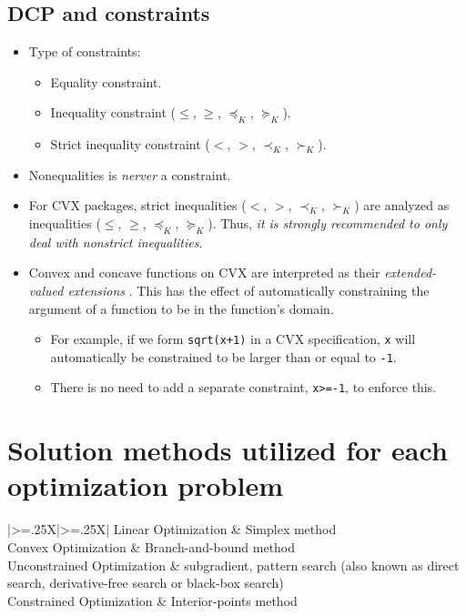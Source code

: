 \documentclass{article}
\begin{document}
\subsection{DCP and constraints}
\begin{itemize}
	\item Type of constraints:
	      \begin{itemize}
		      \item Equality constraint.
		      \item Inequality constraint (\(\leq\), \(\geq\), \(\preceq_K\), \(\succeq_K\)).
		      \item Strict inequality constraint (\(<\), \(>\), \(\prec_K\), \(\succ_K\)).
	      \end{itemize}
	\item Nonequalities is \emph{nerver} a constraint.
	\item For CVX packages, strict inequalities (\(<\), \(>\), \(\prec_K\), \(\succ_K\)) are analyzed as inequalities (\(\leq\), \(\geq\), \(\preceq_K\), \(\succeq_K\)). Thus, \emph{it is strongly recommended to only deal with nonstrict inequalities}.
	\item Convex and concave functions on CVX are interpreted as their \emph{extended-valued extensions} \cite{DCPRulesetCVX}. This has the effect of automatically constraining the argument of a function to be in the function's domain.
	      \begin{itemize}
		      \item For example, if we form \texttt{sqrt(x+1)} in a CVX specification, \texttt{x} will automatically be constrained to be larger than or equal to \texttt{-1}.
		      \item There is no need to add a separate constraint, \texttt{x>=-1}, to enforce this.
	      \end{itemize}
\end{itemize}


\section{Solution methods utilized for each optimization problem \cite{macielSlidesOtimizacaoNaolinear}}
\begin{xltabular}[l]{\linewidth}{|>{\hsize=.25\hsize}X|>{\hsize=.25\hsize}X|}
	\hline
	Linear Optimization     & Simplex method \\ \hline
	Convex Optimization         & Branch-and-bound method    \\ \hline
	Unconstrained Optimization         & subgradient, pattern search (also known as direct search, derivative-free search or black-box search)    \\ \hline
	Constrained Optimization & Interior-points method\\ \hline
\end{xltabular}
\end{document}
